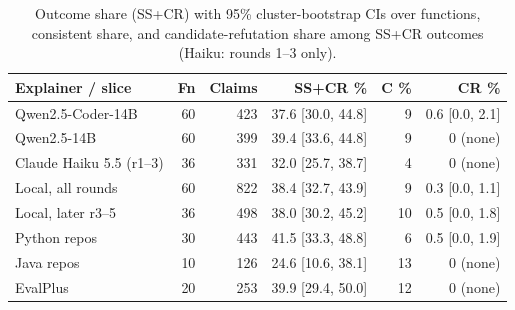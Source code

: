 \begin{table}[t]
\centering
\caption{Outcome share (SS+CR) with 95\% cluster-bootstrap CIs over functions, consistent share, and candidate-refutation share among SS+CR outcomes (Haiku: rounds 1--3 only).}
\label{tab:profile}
\footnotesize\setlength{\tabcolsep}{1.6pt}
\begin{tabular}{@{}lrrrrr@{}}
\toprule
Explainer / slice & Fn & Claims & SS+CR \% & C \% & CR \% \\
\midrule
Qwen2.5-Coder-14B & 60 & 423 & 37.6 [30.0, 44.8] & 9 & 0.6 [0.0, 2.1] \\
Qwen2.5-14B & 60 & 399 & 39.4 [33.6, 44.8] & 9 & 0 (none) \\
Claude Haiku 5.5 (r1--3) & 36 & 331 & 32.0 [25.7, 38.7] & 4 & 0 (none) \\
\midrule
Local, all rounds & 60 & 822 & 38.4 [32.7, 43.9] & 9 & 0.3 [0.0, 1.1] \\
Local, later r3--5 & 36 & 498 & 38.0 [30.2, 45.2] & 10 & 0.5 [0.0, 1.8] \\
\midrule
Python repos & 30 & 443 & 41.5 [33.3, 48.8] & 6 & 0.5 [0.0, 1.9] \\
Java repos & 10 & 126 & 24.6 [10.6, 38.1] & 13 & 0 (none) \\
EvalPlus & 20 & 253 & 39.9 [29.4, 50.0] & 12 & 0 (none) \\
\bottomrule
\end{tabular}
\end{table}
